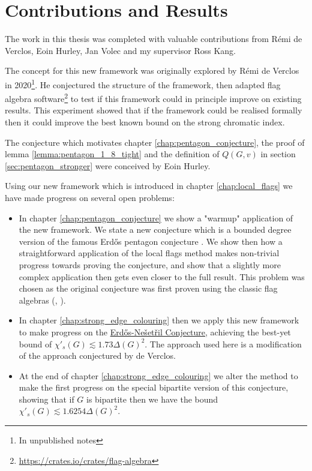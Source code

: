 \section*{Contributions and Results}

The work in this thesis was completed with valuable contributions from Rémi de Verclos,
Eoin Hurley, Jan Volec and my supervisor Ross Kang.

The concept for this new framework was originally explored by Rémi de Verclos in
2020\footnote{In unpublished notes}.
He conjectured the structure of the framework, then adapted flag algebra
software\footnote{\url{https://crates.io/crates/flag-algebra}}
to test if this framework could in principle improve on existing results.
This experiment showed that if the framework could be realised formally then it could improve the
best known bound on the strong chromatic index.

The conjecture which motivates chapter \ref{chap:pentagon_conjecture}, the
proof of lemma \ref{lemma:pentagon_1_8_tight} and the definition of $Q(G,v)$ in
section \ref{sec:pentagon_stronger} were conceived by Eoin Hurley.

\hfill

Using our new framework which is introduced in chapter \ref{chap:local_flags}
we have made progress on several open problems:
\begin{itemize}
    \item In chapter \ref{chap:pentagon_conjecture} we show a "warmup" application of the new
        framework. We state a new conjecture which is a bounded degree version of the famous
        Erd\H{o}s pentagon conjecture \cite{erdos_pentagon_1984}.
        We show then how a straightforward application of the local flags method makes non-trivial
        progress towards proving the conjecture, and show that a slightly more complex application
        then gets even closer to the full result.
        This problem was chosen as the original conjecture was first proven using
        the classic flag algebras (\cite{hatamiNumberPentagonsTrianglefree2013},
        \cite{grzesikMaximumNumberFivecycles2012}).
    \item In chapter \ref{chap:strong_edge_colouring} then we apply this new framework to make progress on the
        \hyperref[conj:intro_erdos_nesetril]{Erd\H{o}s-Nešetřil Conjecture}, achieving the best-yet
        bound of $\chi'_s(G) \lesssim 1.73\Delta(G)^2$. The approach used here is a modification
        of the approach conjectured by de Verclos.
    \item At the end of chapter \ref{chap:strong_edge_colouring} we alter the method to make
        the first progress on the special bipartite version of this conjecture, showing that
        if $G$ is bipartite then we have the bound $\chi'_s(G) \lesssim 1.6254\Delta(G)^2$.
\end{itemize}

